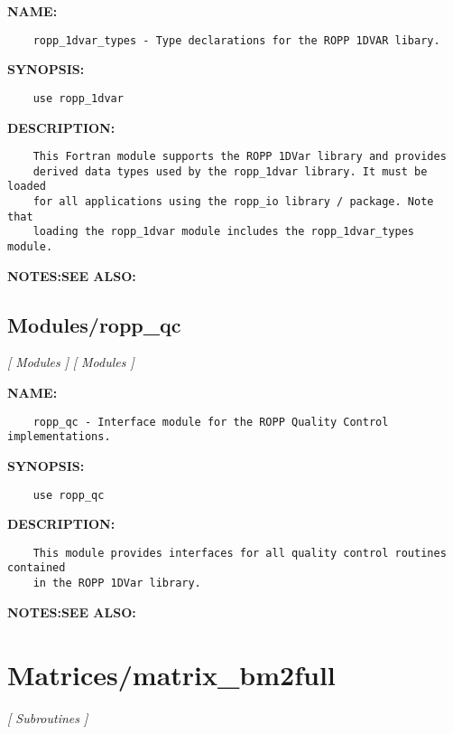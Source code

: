 \label{ch:robo38}
\label{ch:Modules_ropp_1dvar_types}
\textbf{NAME:}\hspace{0.08in}\begin{Verbatim}
    ropp_1dvar_types - Type declarations for the ROPP 1DVAR libary.
\end{Verbatim}
\textbf{SYNOPSIS:}\hspace{0.08in}\begin{Verbatim}
    use ropp_1dvar
\end{Verbatim}
\textbf{DESCRIPTION:}\hspace{0.08in}\begin{Verbatim}
    This Fortran module supports the ROPP 1DVar library and provides
    derived data types used by the ropp_1dvar library. It must be loaded
    for all applications using the ropp_io library / package. Note that
    loading the ropp_1dvar module includes the ropp_1dvar_types module.
\end{Verbatim}
\textbf{NOTES:}\hspace{0.08in}\textbf{SEE ALSO:}\hspace{0.08in}\subsection{Modules/ropp\_qc}
\textsl{[ Modules ]}
\textsl{[ Modules ]}

\label{ch:robo39}
\label{ch:Modules_ropp_qc}
\textbf{NAME:}\hspace{0.08in}\begin{Verbatim}
    ropp_qc - Interface module for the ROPP Quality Control implementations.
\end{Verbatim}
\textbf{SYNOPSIS:}\hspace{0.08in}\begin{Verbatim}
    use ropp_qc
\end{Verbatim}
\textbf{DESCRIPTION:}\hspace{0.08in}\begin{Verbatim}
    This module provides interfaces for all quality control routines contained
    in the ROPP 1DVar library.
\end{Verbatim}
\textbf{NOTES:}\hspace{0.08in}\textbf{SEE ALSO:}\hspace{0.08in}\section{Matrices/matrix\_bm2full}
\textsl{[ Subroutines ]}

